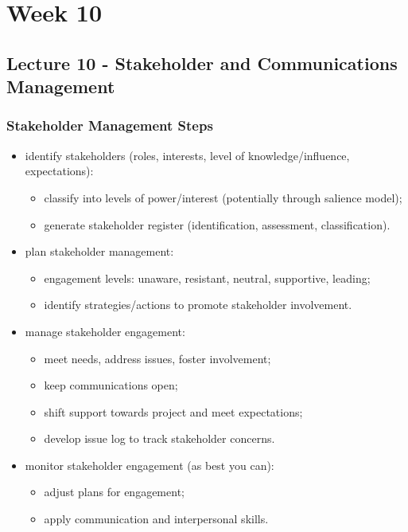 \documentclass[journal]{IEEEtran}
\begin{document}
\section{Week 10}
\subsection{\textbf{Lecture 10 - Stakeholder and Communications Management}}
\subsubsection{Stakeholder Management Steps}
\begin{itemize}
	\item identify stakeholders (roles, interests, level of knowledge/influence, expectations):
	\begin{itemize}
		\item classify into levels of power/interest (potentially through salience model);
		\item generate stakeholder register (identification, assessment, classification).
	\end{itemize}
	\item plan stakeholder management:
	\begin{itemize}
		\item engagement levels: unaware, resistant, neutral, supportive, leading;
		\item identify strategies/actions to promote stakeholder involvement.
	\end{itemize}
	\item manage stakeholder engagement:
	\begin{itemize}
		\item meet needs, address issues, foster involvement;
		\item keep communications open;
		\item shift support towards project and meet expectations;
		\item develop issue log to track stakeholder concerns.
	\end{itemize}
	\item monitor stakeholder engagement (as best you can):
	\begin{itemize}
		\item adjust plans for engagement;
		\item apply communication and interpersonal skills.
	\end{itemize}
\end{itemize}
\end{document}
